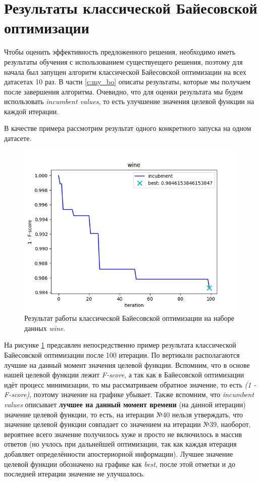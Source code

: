 \documentclass[times,specification,annotation]{itmo-student-thesis}
\begin{document}
	\section{Результаты классической Байесовской оптимизации} \label{s:bo-res}
	Чтобы оценить эффективность предложенного решения, необходимо иметь результаты обучения с использованием существуещего решения, поэтому для начала был запущен алгоритм классической Байесовской оптимизации на всех датасетах 10 раз. В части \ref{c:my_bo} описаты результаты, которые мы получаем после завершения алгоритма. Очевидно, что для оценки результата мы будем использовать \textit{incumbent values}, то есть улучшение значения целевой функции на каждой итерации. \par 
	
	В качестве примера рассмотрим результат одного конкретного запуска на одном датасете.
	\begin{figure}[!ht]
		\caption{Результат работы классической Байесовской оптимизации на наборе данных \textit{wine}.}\label{img:bo-wine}
		\includegraphics[width=0.85\linewidth]{../png/incubment-iteration/wine}
		\centering
	\end{figure}
	На рисунке \ref{img:bo-wine} предсавлен непосредственно пример результата классической Байесовской оптимизации после 100 итерации. По вертикали располагаются лучшие на данный момент значения целевой функции. Вспомним, что в основе нашей целевой функции лежит \textit{F-score}, а так как в Байесовской оптимизации идёт процесс минимизации, то мы рассматриваем обратное значение, то есть \textit{(1 - F-score)}, поэтому значение на графике убывает. Также вспомним, что \textit{incumbent values} описывает \textbf{лучшее на данный момент времени} (на данной итерации) значение целевой функции, то есть, на итерации №40 нельзя утверждать, что значение целевой функции совпадает со значением на итерации №39, наоборот, вероятнее всего значение получилось хуже и просто не включилось в массив ответов (но учлось при дальнейшей оптимизации, так как каждая итерация добавляет определённости апостериорной информации). Лучшее значение целевой функции обозначено на графике как \textit{best}, после этой отметки и до последней итерации значение не улучшалось. \par 
	
\end{document}
